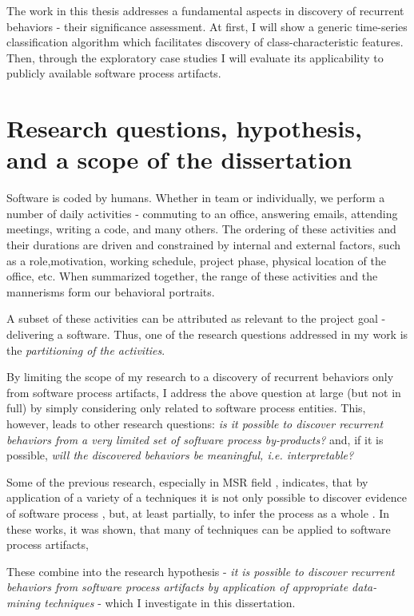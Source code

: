 The work in this thesis addresses a fundamental aspects in discovery of recurrent behaviors - their significance assessment.
At first, I will show a generic time-series classification algorithm which facilitates discovery of class-characteristic features.
Then, through the exploratory case studies I will evaluate its applicability to publicly available software process artifacts.

\section{Research questions, hypothesis, and a scope of the dissertation}
Software is coded by humans. Whether in team or individually, we perform a number of daily activities - 
commuting to an office, answering emails, attending meetings, writing a code, and many others. 
The ordering of these activities and their durations are driven and constrained by internal and external factors, 
such as a role,motivation, working schedule, project phase, physical location of the office, etc. 
When summarized together, the range of these activities and the mannerisms form our behavioral portraits.

A subset of these activities can be attributed as relevant to the project goal - delivering a software. 
Thus, one of the research questions addressed in my work is the \textit{partitioning of the activities}. 

By limiting the scope of my research to a discovery of recurrent behaviors only from software process 
artifacts, I address the above question at large (but not in full) by simply considering only related to software 
process entities.
This, however, leads to other research questions: 
\textit{is it possible to discover recurrent behaviors from a very limited set of software process by-products?} 
and, if it is possible, 
\textit{will the discovered behaviors be meaningful, i.e. interpretable?}

Some of the previous research, especially in MSR field  \cite{citeulike:9114115, citeulike:7853299}, 
indicates, that by application of a variety of a techniques it is not only possible to discover evidence of 
software process \cite{citeulike:9007622}, but, at least partially, to infer the process as a whole \cite{citeulike:5128808}. 
In these works, it was shown, that many of techniques can be applied to software process artifacts, 

These combine into the research hypothesis - \textit{it is possible to discover recurrent behaviors 
from software process artifacts by application of appropriate data-mining techniques} - 
which I investigate in this dissertation. 

